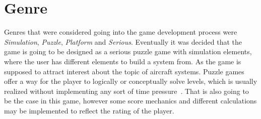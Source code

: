 \section{Genre}\label{sec:genre}
Genres that were considered going into the game development process were \textit{Simulation}, \textit{Puzzle}, \textit{Platform} and \textit{Serious}.
Eventually it was decided that the game is going to be designed as a serious puzzle game with simulation elements, where the user has different elements to build a system from.
As the game is supposed to attract interest about the topic of aircraft systems.
Puzzle games offer a way for the player to logically or conceptually solve levels, which is usually realized without
implementing any sort of time pressure~\cite{10.5555/2544002}.
That is also going to be the case in this game, however some score mechanics and different calculations may be implemented to reflect
the rating of the player.
